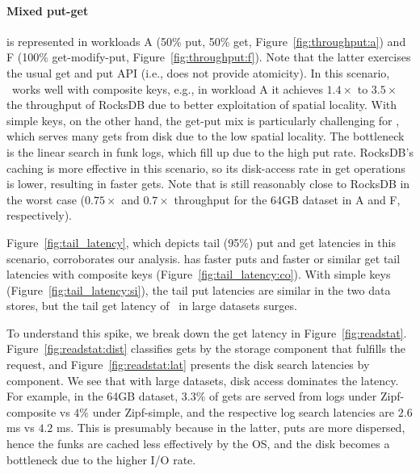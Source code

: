 \paragraph{ Mixed put-get} is represented in workloads A (50\% put, 50\% get, Figure~\ref{fig:throughput:a}) and 
F (100\% get-modify-put, Figure~\ref{fig:throughput:f}). Note that the latter exercises the usual get and put API (i.e., does not provide atomicity). 
In this scenario, \sys\ works well with composite keys, e.g., in workload A it  achieves $1.4\times$ to $3.5\times$ the throughput of RocksDB due to better exploitation of spatial locality. 
With simple keys, on the other hand, the get-put mix is particularly challenging for \sys, which serves many gets from disk due to the
low spatial locality. The bottleneck is the linear search in funk logs, which  fill
up due to the high put rate.
RocksDB's caching is more effective in this scenario, so its disk-access rate in get operations is lower,  resulting in faster gets. 
Note that \sys\/ is still reasonably close to RocksDB in the worst case 
($0.75\times$ and $0.7\times$ throughput for the 64GB dataset in A and F, respectively).

Figure~\ref{fig:tail_latency}, which depicts tail (95\%) put and get latencies in this scenario, 
corroborates our analysis. \sys\/ has faster puts and faster or similar get tail latencies with composite keys
(Figure~\ref{fig:tail_latency:co}). With simple keys (Figure~\ref{fig:tail_latency:si}),  
the tail put latencies are similar in the two data stores, but the tail get latency of \sys\ 
in large datasets surges.

 To understand this spike, 
we break down the get latency in  Figure~\ref{fig:readstat}. 
Figure~\ref{fig:readstat:dist} classifies gets by the storage  component 
that fulfills the request, and Figure~\ref{fig:readstat:lat} presents the disk search latencies by component. 
We see that with large datasets, disk access dominates the latency.
For example, in the 64GB dataset, $3.3\%$ of gets are served from logs under Zipf-composite vs $4\%$ under Zipf-simple,
and the respective log search latencies are $2.6$ ms vs $4.2$ ms. This is presumably because in the latter, puts are more dispersed, 
hence the funks are cached less effectively by the OS, and the disk becomes a bottleneck due to the higher I/O rate.

